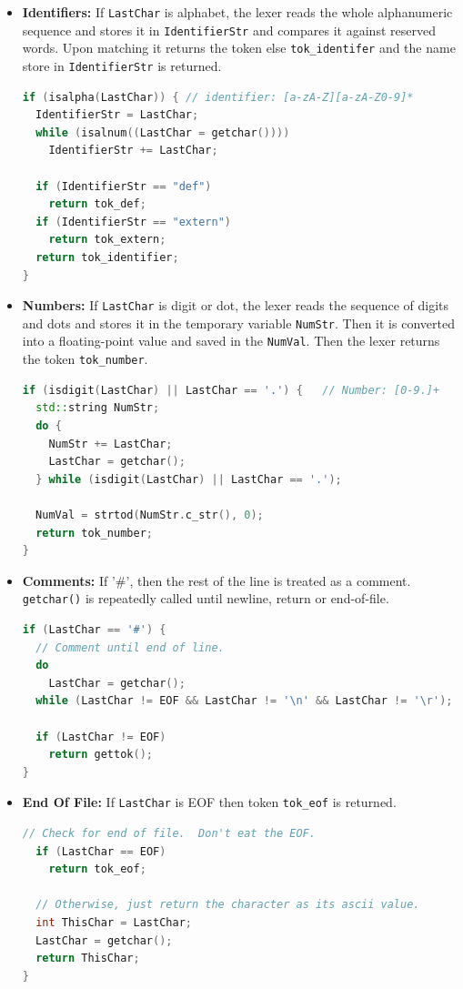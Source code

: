 \documentclass[acmlarge, nonacm]{acmart}
\begin{document}
\begin{itemize}
\item{\textbf{Identifiers:}} If \verb|LastChar| is alphabet, the lexer reads the whole alphanumeric sequence and stores it in \verb|IdentifierStr| and compares it against reserved words. Upon matching it returns the token else \verb|tok_identifer| and the name store in \verb|IdentifierStr| is returned. 
\begin{lstlisting}[language=C++]
if (isalpha(LastChar)) { // identifier: [a-zA-Z][a-zA-Z0-9]*
  IdentifierStr = LastChar;
  while (isalnum((LastChar = getchar())))
    IdentifierStr += LastChar;

  if (IdentifierStr == "def")
    return tok_def;
  if (IdentifierStr == "extern")
    return tok_extern;
  return tok_identifier;
}

\end{lstlisting}

\item{\textbf{Numbers:}} If \verb|LastChar| is digit or dot, the lexer reads the sequence of digits and dots and stores it in the temporary variable \verb|NumStr|. Then it is converted into a floating-point value and saved in the \verb|NumVal|. Then the lexer returns the token \verb|tok_number|.
\begin{lstlisting}[language=C++]
if (isdigit(LastChar) || LastChar == '.') {   // Number: [0-9.]+
  std::string NumStr;
  do {
    NumStr += LastChar;
    LastChar = getchar();
  } while (isdigit(LastChar) || LastChar == '.');

  NumVal = strtod(NumStr.c_str(), 0);
  return tok_number;
}
\end{lstlisting}

\item{\textbf{Comments:}} If '$\#$', then the rest of the line is treated as a comment. \verb|getchar()| is repeatedly called until newline, return or end-of-file.
\begin{lstlisting}[language=C++]
if (LastChar == '#') {
  // Comment until end of line.
  do
    LastChar = getchar();
  while (LastChar != EOF && LastChar != '\n' && LastChar != '\r');

  if (LastChar != EOF)
    return gettok();
}
\end{lstlisting}

\item{\textbf{End Of File:}} If \verb|LastChar| is EOF then token \verb|tok_eof| is returned.
\begin{lstlisting}[language=C++]
  // Check for end of file.  Don't eat the EOF.
  if (LastChar == EOF)
    return tok_eof;

  // Otherwise, just return the character as its ascii value.
  int ThisChar = LastChar;
  LastChar = getchar();
  return ThisChar;
}
\end{lstlisting}
\end{itemize}
\end{document}
